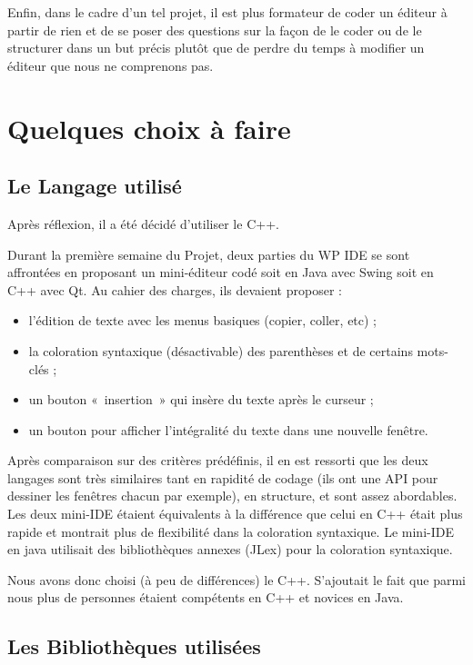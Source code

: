 			Enfin, dans le cadre d'un tel projet, il est plus formateur de coder un éditeur à partir de rien et de se poser des questions sur la façon de le coder ou de le structurer dans un but précis plutôt que de perdre du temps à modifier un éditeur que nous ne comprenons pas.

\section{Quelques choix à faire}

    \subsection{Le Langage utilisé}
    
		Après réflexion, il a été décidé d'utiliser le C++.
		
		Durant la première semaine du Projet, deux parties du WP IDE se sont affrontées en proposant un mini-éditeur codé soit en Java avec Swing soit en C++ avec Qt. 
		Au cahier des charges, ils devaient proposer : 
		\begin{itemize}
			\item l'édition de texte avec les menus basiques (copier, coller, etc) ;
			\item la coloration syntaxique (désactivable) des parenthèses et de certains mots-clés ;
			\item un bouton « insertion » qui insère du texte après le curseur ;
			\item un bouton pour afficher l'intégralité du texte dans une nouvelle fenêtre.
		\end{itemize}
		Après comparaison sur des critères prédéfinis, il en est ressorti que les deux langages sont très similaires tant en rapidité de codage (ils ont une API pour dessiner les fenêtres chacun par exemple), en structure, et sont assez abordables.
		Les deux mini-IDE étaient équivalents à la différence que celui en C++ était plus rapide et montrait plus de flexibilité dans la coloration syntaxique.
		Le mini-IDE en java utilisait des bibliothèques annexes (JLex) pour la coloration syntaxique.
		
		Nous avons donc choisi (à peu de différences) le C++. S'ajoutait le fait que parmi nous plus de personnes étaient compétents en C++ et novices en Java.
    
    \subsection{Les Bibliothèques utilisées}
    
